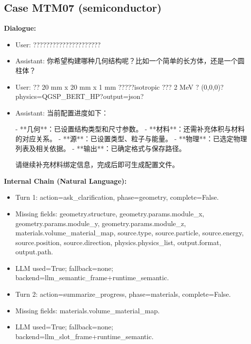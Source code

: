 \documentclass[11pt]{ctexart}
\begin{document}
\subsection{Case MTM07 (semiconductor)}
\textbf{Dialogue:}
\begin{itemize}
\item User: ?????????????????????
\item Assistant: 你希望构建哪种几何结构呢？比如一个简单的长方体，还是一个圆柱体？
\item User: ?? 20 mm x 20 mm x 1 mm ?????isotropic ??? 2 MeV ? (0,0,0)?physics=QGSP\_BERT\_HP?output=json?
\item Assistant: 当前配置进度如下：

- **几何**：已设置结构类型和尺寸参数。
- **材料**：还需补充体积与材料的对应关系。
- **源**：已设置类型、粒子与能量。
- **物理**：已选定物理列表及相关依据。
- **输出**：已确定格式与保存路径。

请继续补充材料绑定信息，完成后即可生成配置文件。
\end{itemize}
\textbf{Internal Chain (Natural Language):}
\begin{itemize}
\item Turn 1: action=ask\_clarification, phase=geometry, complete=False.
\item Missing fields: geometry.structure, geometry.params.module\_x, geometry.params.module\_y, geometry.params.module\_z, materials.volume\_material\_map, source.type, source.particle, source.energy, source.position, source.direction, physics.physics\_list, output.format, output.path.
\item LLM used=True; fallback=none; backend=llm\_semantic\_frame+runtime\_semantic.
\item Turn 2: action=summarize\_progress, phase=materials, complete=False.
\item Missing fields: materials.volume\_material\_map.
\item LLM used=True; fallback=none; backend=llm\_slot\_frame+runtime\_semantic.
\end{itemize}
\end{document}

